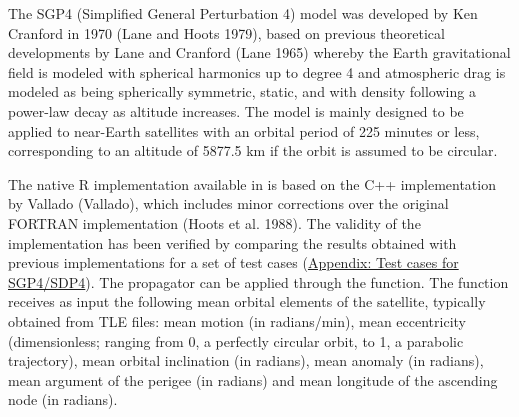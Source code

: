 The SGP4 (Simplified General Perturbation 4) model was developed by Ken Cranford in 1970 (Lane and Hoots 1979), based on previous theoretical developments by Lane and Cranford (Lane 1965) whereby the Earth gravitational field is modeled with spherical harmonics up to degree 4 and atmospheric drag is modeled as being spherically symmetric, static, and with density following a power-law decay as altitude increases. The model is mainly designed to be applied to near-Earth satellites with an orbital period of 225 minutes or less, corresponding to an altitude of 5877.5 km if the orbit is assumed to be circular.

The native R implementation available in  is based on the C++ implementation by Vallado (Vallado), which includes minor corrections over the original FORTRAN implementation (Hoots et al. 1988). The validity of the implementation has been verified by comparing the results obtained with previous implementations for a set of test cases (\protect\hyperlink{appendix-test-cases-for-sgp4sdp4}{Appendix: Test cases for SGP4/SDP4}). The propagator can be applied through the  function. The function receives as input the following mean orbital elements of the satellite, typically obtained from TLE files: mean motion (in radians/min), mean eccentricity (dimensionless; ranging from 0, a perfectly circular orbit, to 1, a parabolic trajectory), mean orbital inclination (in radians), mean anomaly (in radians), mean argument of the perigee (in radians) and mean longitude of the ascending node (in radians).

